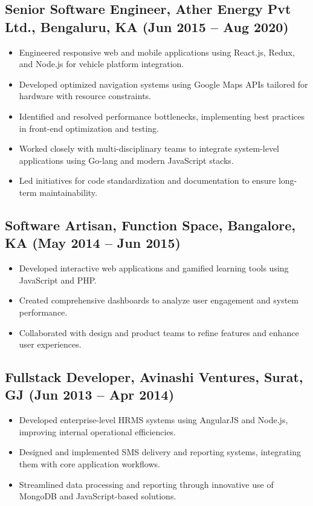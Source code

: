\documentclass[10pt,a4paper]{article}
\begin{document}
\subsection*{Senior Software Engineer, Ather Energy Pvt Ltd., Bengaluru, KA (Jun 2015 -- Aug 2020)}
\begin{itemize}[leftmargin=*]
  \item Engineered responsive web and mobile applications using React.js, Redux, and Node.js for vehicle platform integration.
  \item Developed optimized navigation systems using Google Maps APIs tailored for hardware with resource constraints.
  \item Identified and resolved performance bottlenecks, implementing best practices in front-end optimization and testing.
  \item Worked closely with multi-disciplinary teams to integrate system-level applications using Go-lang and modern JavaScript stacks.
  \item Led initiatives for code standardization and documentation to ensure long-term maintainability.
\end{itemize}

\subsection*{Software Artisan, Function Space, Bangalore, KA (May 2014 -- Jun 2015)}
\begin{itemize}[leftmargin=*]
  \item Developed interactive web applications and gamified learning tools using JavaScript and PHP.
  \item Created comprehensive dashboards to analyze user engagement and system performance.
  \item Collaborated with design and product teams to refine features and enhance user experiences.
\end{itemize}

\subsection*{Fullstack Developer, Avinashi Ventures, Surat, GJ (Jun 2013 -- Apr 2014)}
\begin{itemize}[leftmargin=*]
  \item Developed enterprise-level HRMS systems using AngularJS and Node.js, improving internal operational efficiencies.
  \item Designed and implemented SMS delivery and reporting systems, integrating them with core application workflows.
  \item Streamlined data processing and reporting through innovative use of MongoDB and JavaScript-based solutions.
\end{itemize}
\end{document}
